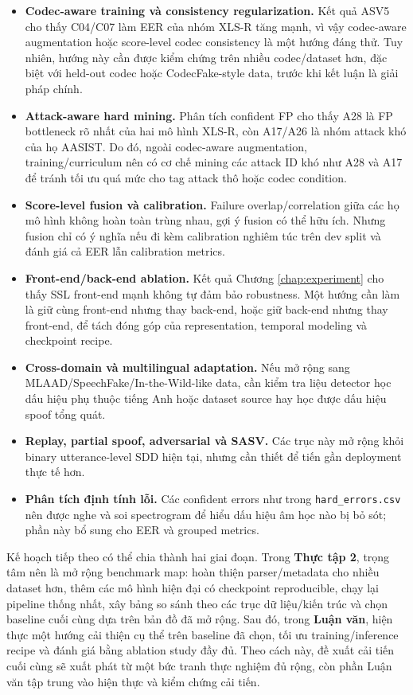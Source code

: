 \begin{itemize}
    \item \textbf{Codec-aware training và consistency regularization.} Kết quả ASV5 cho thấy C04/C07 làm EER của nhóm XLS-R tăng mạnh, vì vậy codec-aware augmentation hoặc score-level codec consistency là một hướng đáng thử. Tuy nhiên, hướng này cần được kiểm chứng trên nhiều codec/dataset hơn, đặc biệt với held-out codec hoặc CodecFake-style data, trước khi kết luận là giải pháp chính.
    \item \textbf{Attack-aware hard mining.} Phân tích confident FP cho thấy A28 là FP bottleneck rõ nhất của hai mô hình XLS-R, còn A17/A26 là nhóm attack khó của họ AASIST. Do đó, ngoài codec-aware augmentation, training/curriculum nên có cơ chế mining các attack ID khó như A28 và A17 để tránh tối ưu quá mức cho tag attack thô hoặc codec condition.
    \item \textbf{Score-level fusion và calibration.} Failure overlap/correlation giữa các họ mô hình không hoàn toàn trùng nhau, gợi ý fusion có thể hữu ích. Nhưng fusion chỉ có ý nghĩa nếu đi kèm calibration nghiêm túc trên dev split và đánh giá cả EER lẫn calibration metrics.
    \item \textbf{Front-end/back-end ablation.} Kết quả Chương \ref{chap:experiment} cho thấy SSL front-end mạnh không tự đảm bảo robustness. Một hướng cần làm là giữ cùng front-end nhưng thay back-end, hoặc giữ back-end nhưng thay front-end, để tách đóng góp của representation, temporal modeling và checkpoint recipe.
    \item \textbf{Cross-domain và multilingual adaptation.} Nếu mở rộng sang MLAAD/SpeechFake/In-the-Wild-like data, cần kiểm tra liệu detector học dấu hiệu phụ thuộc tiếng Anh hoặc dataset source hay học được dấu hiệu spoof tổng quát.
    \item \textbf{Replay, partial spoof, adversarial và SASV.} Các trục này mở rộng khỏi binary utterance-level SDD hiện tại, nhưng cần thiết để tiến gần deployment thực tế hơn.
    \item \textbf{Phân tích định tính lỗi.} Các confident errors như trong \texttt{hard\_errors.csv} nên được nghe và soi spectrogram để hiểu dấu hiệu âm học nào bị bỏ sót; phần này bổ sung cho EER và grouped metrics.
\end{itemize}

Kế hoạch tiếp theo có thể chia thành hai giai đoạn. Trong \textbf{Thực tập 2}, trọng tâm nên là mở rộng benchmark map: hoàn thiện parser/metadata cho nhiều dataset hơn, thêm các mô hình hiện đại có checkpoint reproducible, chạy lại pipeline thống nhất, xây bảng so sánh theo các trục dữ liệu/kiến trúc và chọn baseline cuối cùng dựa trên bản đồ đã mở rộng. Sau đó, trong \textbf{Luận văn}, hiện thực một hướng cải thiện cụ thể trên baseline đã chọn, tối ưu training/inference recipe và đánh giá bằng ablation study đầy đủ. Theo cách này, đề xuất cải tiến cuối cùng sẽ xuất phát từ một bức tranh thực nghiệm đủ rộng, còn phần Luận văn tập trung vào hiện thực và kiểm chứng cải tiến.

